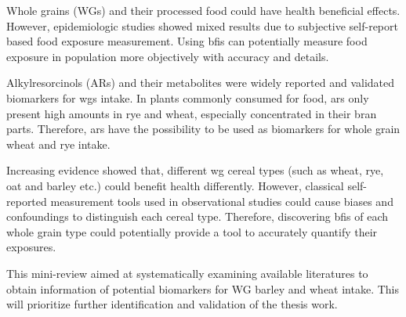 Whole grains (WGs) and their processed food could have health beneficial effects. However, epidemiologic studies showed mixed results due to subjective self-report based food exposure measurement\cite{ISI:000447355100002}. Using \acrfull{bfis} can potentially measure food exposure in population more objectively with accuracy and details\cite{Scalbert2014}.

Alkylresorcinols (ARs) and their metabolites were widely reported and validated biomarkers for \acrshort{wgs} intake. 
In plants commonly consumed for food, \acrshort{ars} only present high amounts in rye and wheat, especially concentrated in their bran parts\cite{arreview2004}. Therefore, \acrshort{ars} have the possibility to be used as biomarkers for whole grain wheat and rye intake.


Increasing evidence showed that, different \acrshort{wg} cereal types (such as wheat, rye, oat and barley etc.) could benefit health differently. 
However, classical self-reported measurement tools used in observational studies could cause biases and confoundings to distinguish each cereal type.
Therefore, discovering \acrshort{bfis} of each whole grain type could potentially provide a tool to accurately quantify their exposures. 

This mini-review aimed at systematically examining available literatures to obtain information of potential biomarkers for WG barley and wheat intake. This will prioritize further identification and validation of the thesis work.
